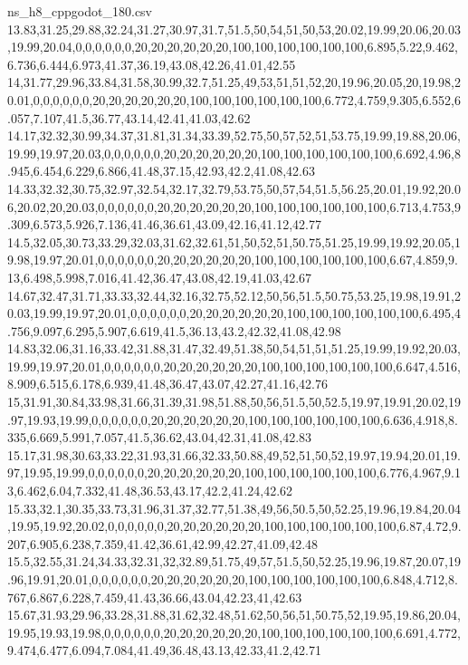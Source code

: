 \begin{filecontents*}[overwrite]{ns_h8_cppgodot_180.csv}
13.83,31.25,29.88,32.24,31.27,30.97,31.7,51.5,50,54,51,50,53,20.02,19.99,20.06,20.03,19.99,20.04,0,0,0,0,0,0,20,20,20,20,20,20,100,100,100,100,100,100,6.895,5.22,9.462,6.736,6.444,6.973,41.37,36.19,43.08,42.26,41.01,42.55
14,31.77,29.96,33.84,31.58,30.99,32.7,51.25,49,53,51,51,52,20,19.96,20.05,20,19.98,20.01,0,0,0,0,0,0,20,20,20,20,20,20,100,100,100,100,100,100,6.772,4.759,9.305,6.552,6.057,7.107,41.5,36.77,43.14,42.41,41.03,42.62
14.17,32.32,30.99,34.37,31.81,31.34,33.39,52.75,50,57,52,51,53.75,19.99,19.88,20.06,19.99,19.97,20.03,0,0,0,0,0,0,20,20,20,20,20,20,100,100,100,100,100,100,6.692,4.96,8.945,6.454,6.229,6.866,41.48,37.15,42.93,42.2,41.08,42.63
14.33,32.32,30.75,32.97,32.54,32.17,32.79,53.75,50,57,54,51.5,56.25,20.01,19.92,20.06,20.02,20,20.03,0,0,0,0,0,0,20,20,20,20,20,20,100,100,100,100,100,100,6.713,4.753,9.309,6.573,5.926,7.136,41.46,36.61,43.09,42.16,41.12,42.77
14.5,32.05,30.73,33.29,32.03,31.62,32.61,51,50,52,51,50.75,51.25,19.99,19.92,20.05,19.98,19.97,20.01,0,0,0,0,0,0,20,20,20,20,20,20,100,100,100,100,100,100,6.67,4.859,9.13,6.498,5.998,7.016,41.42,36.47,43.08,42.19,41.03,42.67
14.67,32.47,31.71,33.33,32.44,32.16,32.75,52.12,50,56,51.5,50.75,53.25,19.98,19.91,20.03,19.99,19.97,20.01,0,0,0,0,0,0,20,20,20,20,20,20,100,100,100,100,100,100,6.495,4.756,9.097,6.295,5.907,6.619,41.5,36.13,43.2,42.32,41.08,42.98
14.83,32.06,31.16,33.42,31.88,31.47,32.49,51.38,50,54,51,51,51.25,19.99,19.92,20.03,19.99,19.97,20.01,0,0,0,0,0,0,20,20,20,20,20,20,100,100,100,100,100,100,6.647,4.516,8.909,6.515,6.178,6.939,41.48,36.47,43.07,42.27,41.16,42.76
15,31.91,30.84,33.98,31.66,31.39,31.98,51.88,50,56,51.5,50,52.5,19.97,19.91,20.02,19.97,19.93,19.99,0,0,0,0,0,0,20,20,20,20,20,20,100,100,100,100,100,100,6.636,4.918,8.335,6.669,5.991,7.057,41.5,36.62,43.04,42.31,41.08,42.83
15.17,31.98,30.63,33.22,31.93,31.66,32.33,50.88,49,52,51,50,52,19.97,19.94,20.01,19.97,19.95,19.99,0,0,0,0,0,0,20,20,20,20,20,20,100,100,100,100,100,100,6.776,4.967,9.13,6.462,6.04,7.332,41.48,36.53,43.17,42.2,41.24,42.62
15.33,32.1,30.35,33.73,31.96,31.37,32.77,51.38,49,56,50.5,50,52.25,19.96,19.84,20.04,19.95,19.92,20.02,0,0,0,0,0,0,20,20,20,20,20,20,100,100,100,100,100,100,6.87,4.72,9.207,6.905,6.238,7.359,41.42,36.61,42.99,42.27,41.09,42.48
15.5,32.55,31.24,34.33,32.31,32,32.89,51.75,49,57,51.5,50,52.25,19.96,19.87,20.07,19.96,19.91,20.01,0,0,0,0,0,0,20,20,20,20,20,20,100,100,100,100,100,100,6.848,4.712,8.767,6.867,6.228,7.459,41.43,36.66,43.04,42.23,41,42.63
15.67,31.93,29.96,33.28,31.88,31.62,32.48,51.62,50,56,51,50.75,52,19.95,19.86,20.04,19.95,19.93,19.98,0,0,0,0,0,0,20,20,20,20,20,20,100,100,100,100,100,100,6.691,4.772,9.474,6.477,6.094,7.084,41.49,36.48,43.13,42.33,41.2,42.71

\end{filecontents*}
